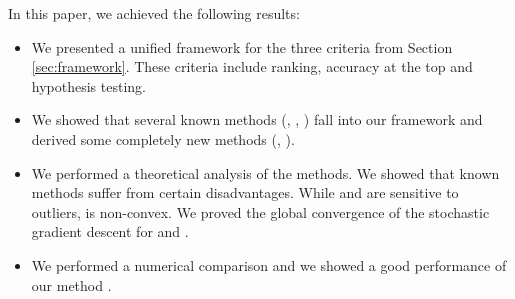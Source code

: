 In this paper, we achieved the following results:
\begin{itemize}
  \item We presented a unified framework for the three criteria from Section \ref{sec:framework}. These criteria include ranking, accuracy at the top and hypothesis testing.
  \item We showed that several known methods (\TopPush, \Grill, \tauFPL) fall into our framework and derived some completely new methods (\PatMat, \PatMatNP).
  \item We performed a theoretical analysis of the methods. We showed that known methods suffer from certain disadvantages. While \TopPush and \tauFPL are sensitive to outliers, \Grill is non-convex. We proved the global convergence of the stochastic gradient descent for \PatMat and \PatMatNP.
  \item We performed a numerical comparison and we showed a good performance of our method \PatMatNP.
\end{itemize}